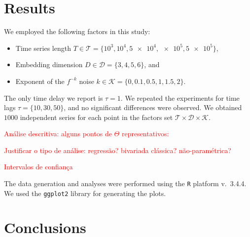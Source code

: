 \documentclass[sts]{imsart}
\begin{document}



\section{Results}\label{Sec:Results}

We employed the following factors in this study:
\begin{itemize}
\item Time series length $T\in\mathcal T=\{10^3,10^4, \num[scientific-notation=true]{5 e4}, \num[scientific-notation=true]{e5}, \num[scientific-notation=true]{5 e5}\}$,
\item Embedding dimension $D\in\mathcal D=\{3, 4, 5, 6\}$, and
\item Exponent of the $f^{-k}$ noise $k\in\mathcal K=\{0, 0.1, 0.5, 1, 1.5, 2\}$.
\end{itemize}
The only time delay we report is $\tau=1$.
We repeated the experiments for time lags $\tau=\{10,30,50\}$, and no significant differences were observed.
We obtained $1000$ independent series for each point in the factors set $\mathcal T\times \mathcal D\times \mathcal K$.

\textcolor{red}{An\'alise descritiva: alguns pontos de $\Theta$ representativos:} 

\textcolor{red}{Justificar o tipo de an\'alise: regressão? bivariada clássica? não-paramétrica?}

\textcolor{red}{Intervalos de confian\c ca}

The data generation and analyses were performed using the \texttt R platform \cite{Rmanual} v.~3.4.4.
We used the \texttt{ggplot2} library \cite{ggplot2Wickman} for generating the plots.

\section{Conclusions}\label{Sec:Conclusions}


\end{document}
